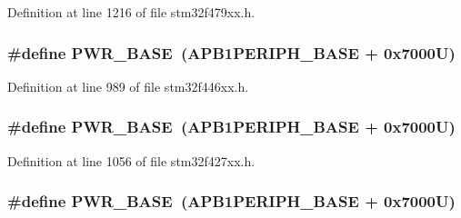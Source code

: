 Definition at line 1216 of file stm32f479xx.\+h.

\subsubsection[{\texorpdfstring{P\+W\+R\+\_\+\+B\+A\+SE}{PWR_BASE}}]{\setlength{\rightskip}{0pt plus 5cm}\#define P\+W\+R\+\_\+\+B\+A\+SE~({\bf A\+P\+B1\+P\+E\+R\+I\+P\+H\+\_\+\+B\+A\+SE} + 0x7000\+U)}\hypertarget{group___peripheral__memory__map_gac691ec23dace8b7a649a25acb110217a}{}\label{group___peripheral__memory__map_gac691ec23dace8b7a649a25acb110217a}


Definition at line 989 of file stm32f446xx.\+h.

\subsubsection[{\texorpdfstring{P\+W\+R\+\_\+\+B\+A\+SE}{PWR_BASE}}]{\setlength{\rightskip}{0pt plus 5cm}\#define P\+W\+R\+\_\+\+B\+A\+SE~({\bf A\+P\+B1\+P\+E\+R\+I\+P\+H\+\_\+\+B\+A\+SE} + 0x7000\+U)}\hypertarget{group___peripheral__memory__map_gac691ec23dace8b7a649a25acb110217a}{}\label{group___peripheral__memory__map_gac691ec23dace8b7a649a25acb110217a}


Definition at line 1056 of file stm32f427xx.\+h.

\subsubsection[{\texorpdfstring{P\+W\+R\+\_\+\+B\+A\+SE}{PWR_BASE}}]{\setlength{\rightskip}{0pt plus 5cm}\#define P\+W\+R\+\_\+\+B\+A\+SE~({\bf A\+P\+B1\+P\+E\+R\+I\+P\+H\+\_\+\+B\+A\+SE} + 0x7000\+U)}\hypertarget{group___peripheral__memory__map_gac691ec23dace8b7a649a25acb110217a}{}\label{group___peripheral__memory__map_gac691ec23dace8b7a649a25acb110217a}


